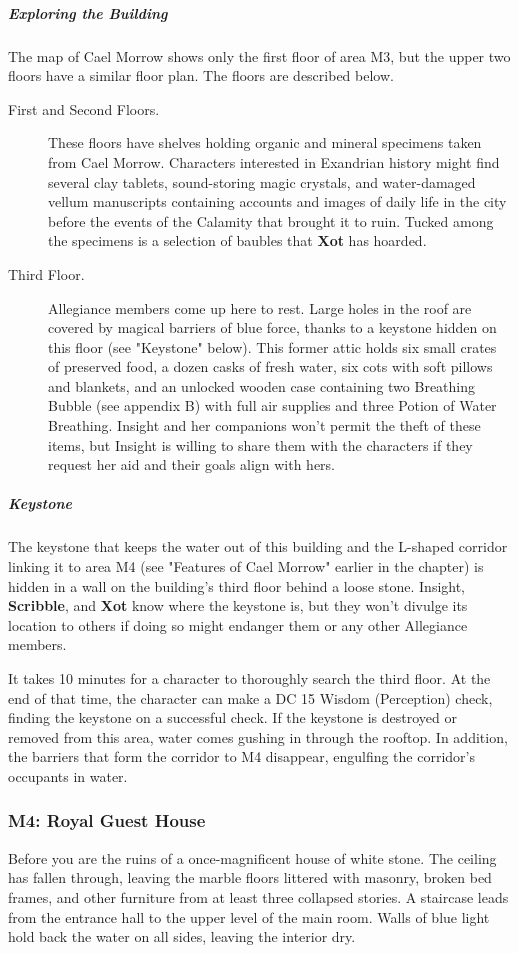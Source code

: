 \documentclass[10pt,a4paper,twoside,fancy,bg=print,twocolumn,openany,nodeprecatedcode]{dndbook}
\begin{document}
\subparagraph{Exploring the Building}
The map of Cael Morrow shows only the first floor of area M3, but the upper two floors have a similar floor plan. The floors are described below.


\begin{description}
\item[First and Second Floors.]
These floors have shelves holding organic and mineral specimens taken from Cael Morrow. Characters interested in Exandrian history might find several clay tablets, sound-storing magic crystals, and water-damaged vellum manuscripts containing accounts and images of daily life in the city before the events of the Calamity that brought it to ruin. Tucked among the specimens is a selection of baubles that \textbf{Xot} has hoarded.
\item[Third Floor.]
Allegiance members come up here to rest. Large holes in the roof are covered by magical barriers of blue force, thanks to a keystone hidden on this floor (see "Keystone" below). This former attic holds six small crates of preserved food, a dozen casks of fresh water, six cots with soft pillows and blankets, and an unlocked wooden case containing two Breathing Bubble (see appendix B) with full air supplies and three Potion of Water Breathing. Insight and her companions won't permit the theft of these items, but Insight is willing to share them with the characters if they request her aid and their goals align with hers.
\end{description}

\subparagraph{Keystone}
The keystone that keeps the water out of this building and the L-shaped corridor linking it to area M4 (see "Features of Cael Morrow" earlier in the chapter) is hidden in a wall on the building's third floor behind a loose stone. Insight, \textbf{Scribble}, and \textbf{Xot} know where the keystone is, but they won't divulge its location to others if doing so might endanger them or any other Allegiance members.

It takes 10 minutes for a character to thoroughly search the third floor. At the end of that time, the character can make a DC 15 Wisdom (Perception) check, finding the keystone on a successful check. If the keystone is destroyed or removed from this area, water comes gushing in through the rooftop. In addition, the barriers that form the corridor to M4 disappear, engulfing the corridor's occupants in water.

\subsubsection{M4: Royal Guest House}
\begin{DndReadAloud}{}
Before you are the ruins of a once-magnificent house of white stone. The ceiling has fallen through, leaving the marble floors littered with masonry, broken bed frames, and other furniture from at least three collapsed stories. A staircase leads from the entrance hall to the upper level of the main room. Walls of blue light hold back the water on all sides, leaving the interior dry.

\end{DndReadAloud}
\end{document}
